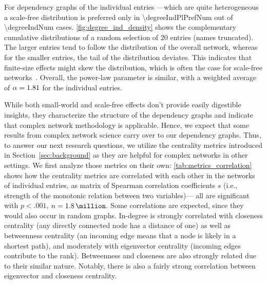 
For dependency graphs of the individual entries%
---which are quite heterogeneous\textemdash%
a scale-free distribution is preferred only in \num{\degreeIndPlPrefNum} out of \num{\degreeIndNum} cases.
\autoref{fig:degree_ind_density} shows the complementary cumulative distributions of a random selection of $20$ entries (names truncated).
The larger entries tend to follow the distribution of the overall network,
whereas for the smaller entries, the tail of the distribution deviates.
This indicates that finite-size effects might skew the distribution,
which is often the case for scale-free networks~\cite{FiniteSize2021Serafino}.
Overall, the power-law parameter is similar, with a weighted average of $\alpha=\num[round-mode=places,round-precision=2]{\degreeIndAlpha}$ for the individual entries.

While both small-world and scale-free effects don't provide easily digestible insights,
they characterize the structure of the dependency graphs
and indicate that complex network methodology is applicable.
Hence, we expect that some results from complex network science carry over to our dependency graphs.
Thus, to answer our next research questions, we utilize the centrality metrics introduced in Section~\ref{sec:background} as they are helpful for complex networks in other settings.
We first analyze those metrics on their own:
\autoref{tab:metrics_correlation} shows how the centrality metrics are correlated with each other in the networks of individual entries,
as matrix of Spearman correlation coefficients $s$ (i.e., strength of the monotonic relation between two variables)---%
all are significant with $p<.001$, $n=\SI[round-mode=places,round-precision=1]{\metricCorrelationN}{\million}$.
Some correlations are expected, since they would also occur in random graphs.
In-degree is strongly correlated with closeness centrality
(any directly connected node has a distance of one)
as well as betweenness centrality
(an incoming edge means that a node is likely in a shortest path),
and moderately with eigenvector centrality
(incoming edges contribute to the rank).
Betweenness and closeness are also strongly related due to their similar nature.
Notably, there is also a fairly strong correlation between eigenvector and closeness centrality.



